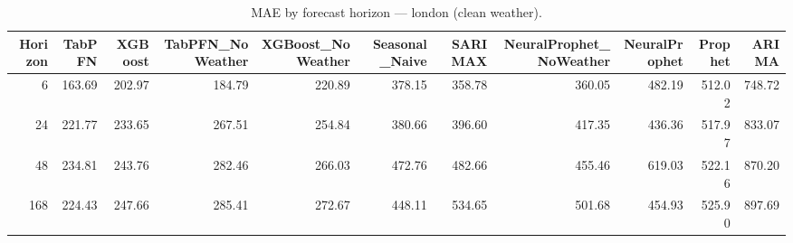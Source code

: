 \begin{table}[ht!]
\centering
\caption{MAE by forecast horizon — london (clean weather).}
\label{tab:mae_by_horizon_london}
\begin{tabular}{rrrrrrrrrrr}
\toprule
Horizon & TabPFN & XGBoost & TabPFN\_NoWeather & XGBoost\_NoWeather & Seasonal\_Naive & SARIMAX & NeuralProphet\_NoWeather & NeuralProphet & Prophet & ARIMA \\
\midrule
6 & 163.69 & 202.97 & 184.79 & 220.89 & 378.15 & 358.78 & 360.05 & 482.19 & 512.02 & 748.72 \\
24 & 221.77 & 233.65 & 267.51 & 254.84 & 380.66 & 396.60 & 417.35 & 436.36 & 517.97 & 833.07 \\
48 & 234.81 & 243.76 & 282.46 & 266.03 & 472.76 & 482.66 & 455.46 & 619.03 & 522.16 & 870.20 \\
168 & 224.43 & 247.66 & 285.41 & 272.67 & 448.11 & 534.65 & 501.68 & 454.93 & 525.90 & 897.69 \\
\bottomrule
\end{tabular}
\end{table}
